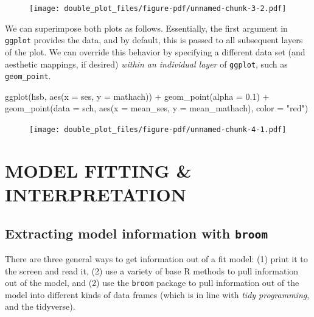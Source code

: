 \documentclass[
  letterpaper,
  DIV=11,
  numbers=noendperiod]{scrreprt}
\newenvironment{Shaded}{\begin{snugshade}}{\end{snugshade}}
\newcommand{\AttributeTok}[1]{\textcolor[rgb]{0.49,0.56,0.16}{#1}}
\newcommand{\FloatTok}[1]{\textcolor[rgb]{0.25,0.63,0.44}{#1}}
\newcommand{\FunctionTok}[1]{\textcolor[rgb]{0.02,0.16,0.49}{#1}}
\newcommand{\NormalTok}[1]{\textcolor[rgb]{0.00,0.44,0.13}{#1}}
\newcommand{\SpecialCharTok}[1]{\textcolor[rgb]{0.25,0.44,0.63}{#1}}
\newcommand{\StringTok}[1]{\textcolor[rgb]{0.25,0.44,0.63}{#1}}
\begin{document}
\begin{figure}[H]

{\centering \texttt{[image: double\_plot\_files/figure-pdf/unnamed-chunk-3-2.pdf]}

}

\end{figure}

We can superimpose both plots as follows. Essentially, the first
argument in \texttt{ggplot} provides the data, and by default, this is
passed to all subsequent layers of the plot. We can override this
behavior by specifying a different data set (and aesthetic mappings, if
desired) \emph{within an individual layer} of \texttt{ggplot}, such as
\texttt{geom\_point}.

\begin{Shaded}
\begin{Highlighting}[]
\FunctionTok{ggplot}\NormalTok{(hsb, }\FunctionTok{aes}\NormalTok{(}\AttributeTok{x =}\NormalTok{ ses, }\AttributeTok{y =}\NormalTok{ mathach)) }\SpecialCharTok{+}
  \FunctionTok{geom\_point}\NormalTok{(}\AttributeTok{alpha =} \FloatTok{0.1}\NormalTok{) }\SpecialCharTok{+}
  \FunctionTok{geom\_point}\NormalTok{(}\AttributeTok{data =}\NormalTok{ sch, }\FunctionTok{aes}\NormalTok{(}\AttributeTok{x =}\NormalTok{ mean\_ses, }\AttributeTok{y =}\NormalTok{ mean\_mathach), }\AttributeTok{color =} \StringTok{"red"}\NormalTok{)}
\end{Highlighting}
\end{Shaded}

\begin{figure}[H]

{\centering \texttt{[image: double\_plot\_files/figure-pdf/unnamed-chunk-4-1.pdf]}

}

\end{figure}

\part{MODEL FITTING \& INTERPRETATION}

\hypertarget{extracting-model-information-with-broom}{%
\chapter{\texorpdfstring{Extracting model information with
\texttt{broom}}{Extracting model information with broom}}\label{extracting-model-information-with-broom}}

There are three general ways to get information out of a fit model: (1)
print it to the screen and read it, (2) use a variety of base R methods
to pull information out of the model, and (2) use the \texttt{broom}
package to pull information out of the model into different kinds of
data frames (which is in line with \emph{tidy programming}, and the
tidyverse).
\end{document}
